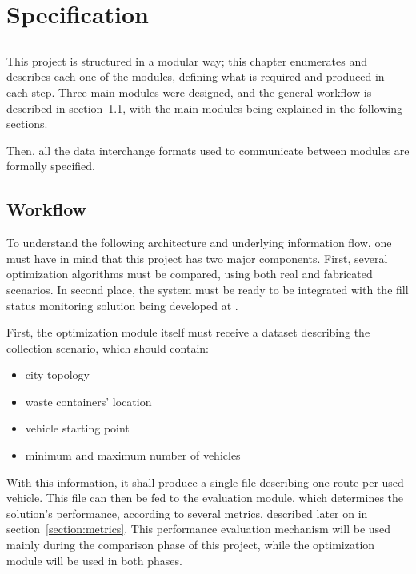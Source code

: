 \chapter{Specification}
\label{chap:specification}

\section*{}

This project is structured in a modular way; this chapter enumerates and
describes each one of the modules, defining what is required and produced in
each step. Three main modules were designed, and the general workflow is
described in section~\ref{section:workflow}, with the main modules being
explained in the following sections.

Then, all the data interchange formats used to communicate between modules are
formally specified.




\section{Workflow}
\label{section:workflow}

To understand the following architecture and underlying information flow, one
must have in mind that this project has two major components. First, several
optimization algorithms must be compared, using both real and fabricated
scenarios. In second place, the system must be ready to be integrated with the
fill status monitoring solution being developed at \fhp{}.

First, the optimization module itself must receive a dataset describing the
collection scenario, which should contain:

\begin{itemize}
  \item city topology
  \item waste containers' location
  \item vehicle starting point
  \item minimum and maximum number of vehicles
\end{itemize}

With this information, it shall produce a single file describing one route per
used vehicle. This file can then be fed to the evaluation module, which
determines the solution's performance, according to several metrics, described
later on in section~\ref{section:metrics}. This performance evaluation
mechanism will be used mainly during the comparison phase of this project,
while the optimization module will be used in both phases.

